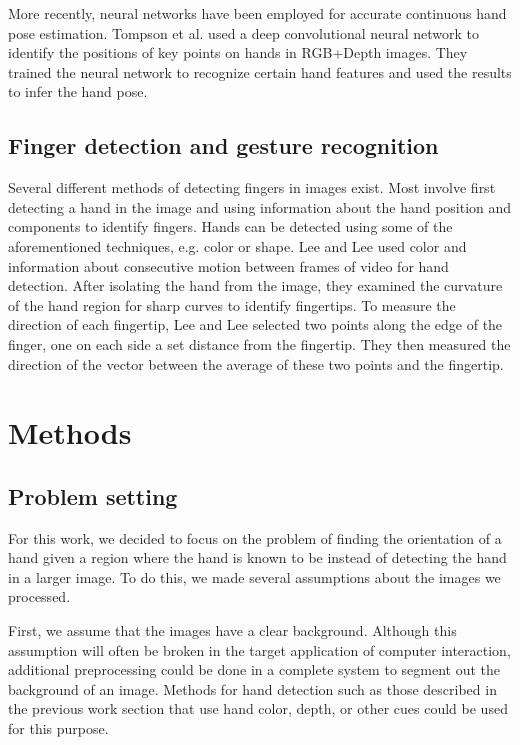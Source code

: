 \documentclass[10pt,twocolumn,letterpaper]{article}
\begin{document}
More recently, neural networks have been employed for accurate continuous hand pose estimation. Tompson et al. \cite{tompson2014real} used a deep convolutional neural network to identify the positions of key points on hands in RGB+Depth images. They trained the neural network to recognize certain hand features and used the results to infer the hand pose.

\subsection{Finger detection and gesture recognition}

Several different methods of detecting fingers in images exist. Most involve first detecting a hand in the image and using information about the hand position and components to identify fingers. Hands can be detected using some of the aforementioned techniques, e.g. color or shape. Lee and Lee \cite{lee2011vision} used color and information about consecutive motion between frames of video for hand detection. After isolating the hand from the image, they examined the curvature of the hand region for sharp curves to identify fingertips. To measure the direction of each fingertip, Lee and Lee selected two points along the edge of the finger, one on each side a set distance from the fingertip. They then measured the direction of the vector between the average of these two points and the fingertip.

\section{Methods}

\subsection{Problem setting} %

For this work, we decided to focus on the problem of finding the orientation of a hand given a region where the hand is known to be instead of detecting the hand in a larger image.  To do this, we made several assumptions about the images we processed.

First, we assume that the images have a clear background.  Although this assumption will often be broken in the target application of computer interaction, additional preprocessing could be done in a complete system to segment out the background of an image.  Methods for hand detection such as those described in the previous work section that use hand color, depth, or other cues could be used for this purpose.
\end{document}
